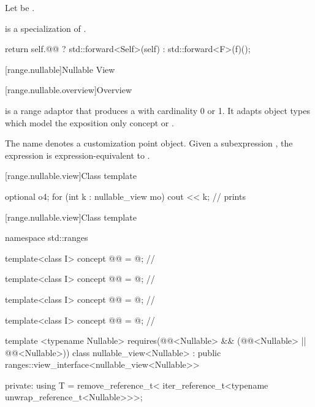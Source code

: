 \documentclass[a4paper,10pt,oneside,openany,final,article]{memoir}
\begin{document}
\begin{wording}
\begin{itemdescr}
  Let  be .

  \pnum
  \mandates
   is a specialization of .

\pnum{}
\returns
\begin{codeblock}
  return self.@@ ? std::forward<Self>(self) : std::forward<F>(f)();
\end{codeblock}
\end{itemdescr}


[range.nullable]{Nullable View}

[range.nullable.overview]{Overview}

\pnum
{} is a range adaptor that produces a  with cardinality 0 or 1. It adapts object types which model the exposition only concept  or .


\pnum
{}%
The name  denotes a
customization point object.
Given a subexpression , the expression
 is expression-equivalent to
.

[range.nullable.view]{Class template }

\begin{example}
  \begin{codeblock}
    optional o{4};
    for (int k : nullable_view m{o})
      cout << k;        // prints 
  \end{codeblock}
\end{example}

[range.nullable.view]{Class template }

\begin{codeblock}
namespace std::ranges {
  template<class I>
  concept @@ = @\seebelownc@;  // \expos

  template<class I>
    concept @@ = @\seebelownc@;  // \expos

  template<class I>
    concept @@ = @\seebelownc@;  // \expos

  template<class I>
    concept @@ = @\seebelownc@;    // \expos

  template <typename Nullable>
    requires(@@<Nullable> &&
      (@@<Nullable> || @@<Nullable>))
  class nullable_view<Nullable>
    : public ranges::view_interface<nullable_view<Nullable>> {
  private:
    using T = remove_reference_t<
        iter_reference_t<typename unwrap_reference_t<Nullable>>>;

}}
\end{codeblock}
\end{wording}
\end{document}

